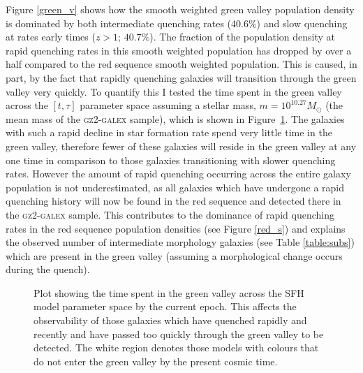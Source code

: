 Figure \ref{green_v} shows how the smooth weighted green valley population density is dominated by both intermediate quenching rates ($40.6\%$) and slow quenching at rates early times ($z > 1$; $40.7\%$). The fraction of the population density at rapid quenching rates in this smooth weighted population has dropped by over a half compared to the red sequence smooth weighted population. This is caused, in part, by the fact that rapidly quenching galaxies will transition through the green valley very quickly. To quantify this I tested the time spent in the green valley across the $[t, \tau]$ parameter space assuming a stellar mass, $m = 10^{10.27} M_{\odot}$ (the mean mass of the \textsc{gz2-galex} sample), which is shown in Figure~\ref{fig:timeingv}. The galaxies with such a rapid decline in star formation rate spend very little time in the green valley, therefore fewer of these galaxies will reside in the green valley at any one time in comparison to those galaxies transitioning with slower quenching rates. However the amount of rapid quenching occurring across the entire galaxy population is not underestimated, as all galaxies which have undergone a rapid quenching history will now be found in the red sequence and detected there in the \textsc{gz2-galex} sample.  This contributes to the dominance of rapid quenching rates in the red sequence population densities (see Figure \ref{red_s}) and explains the observed number of intermediate morphology galaxies (see Table \ref{table:subs}) which are present in the green valley (assuming a morphological change occurs during the quench).

\begin{figure}
\caption[Time spent in the green valley across parameter space]{Plot showing the time spent in the green valley across the SFH model parameter space by the current epoch. This affects the observability of those galaxies which have quenched rapidly and recently and have passed too quickly through the green valley to be detected. The white region denotes those models with colours that do not enter the green valley by the present cosmic time.}
\label{fig:timeingv}
\end{figure}

